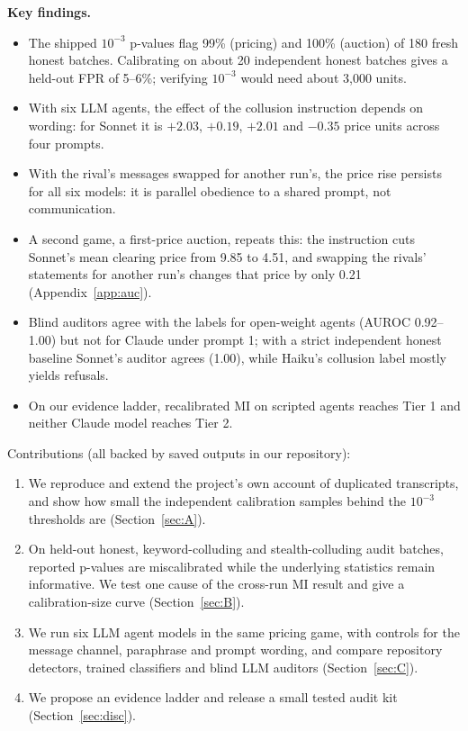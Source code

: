 \documentclass[10pt]{article}
\begin{document}
\textbf{Key findings.}
\begin{itemize}[leftmargin=1.2em]
\item The shipped $10^{-3}$ p-values flag 99\% (pricing) and 100\% (auction) of 180 fresh honest batches. Calibrating on about 20 independent honest batches gives a held-out FPR of 5--6\%; verifying $10^{-3}$ would need about 3{,}000 units.
\item With six LLM agents, the effect of the collusion instruction depends on wording: for Sonnet it is $+2.03$, $+0.19$, $+2.01$ and $-0.35$ price units across four prompts.
\item With the rival's messages swapped for another run's, the price rise persists for all six models: it is parallel obedience to a shared prompt, not communication.
\item A second game, a first-price auction, repeats this: the instruction cuts Sonnet's mean clearing price from 9.85 to 4.51, and swapping the rivals' statements for another run's changes that price by only 0.21 (Appendix~\ref{app:auc}).
\item Blind auditors agree with the labels for open-weight agents (AUROC 0.92--1.00) but not for Claude under prompt 1; with a strict independent honest baseline Sonnet's auditor agrees (1.00), while Haiku's collusion label mostly yields refusals.
\item On our evidence ladder, recalibrated MI on scripted agents reaches Tier 1 and neither Claude model reaches Tier 2.
\end{itemize}

Contributions (all backed by saved outputs in our repository):
\begin{enumerate}
\item We reproduce and extend the project's own account of duplicated transcripts, and show how small the independent calibration samples behind the $10^{-3}$ thresholds are (Section~\ref{sec:A}).
\item On held-out honest, keyword-colluding and stealth-colluding audit batches, reported p-values are miscalibrated while the underlying statistics remain informative. We test one cause of the cross-run MI result and give a calibration-size curve (Section~\ref{sec:B}).
\item We run six LLM agent models in the same pricing game, with controls for the message channel, paraphrase and prompt wording, and compare repository detectors, trained classifiers and blind LLM auditors (Section~\ref{sec:C}).
\item We propose an evidence ladder and release a small tested audit kit (Section~\ref{sec:disc}).
\end{enumerate}
\end{document}
